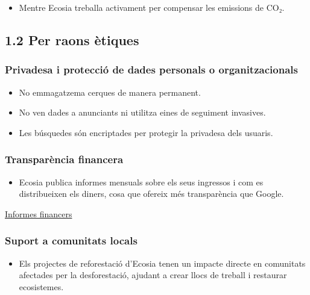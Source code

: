 \documentclass[
  a4paper,
]{article}
\providecommand{\tightlist}{%
  \setlength{\itemsep}{0pt}\setlength{\parskip}{0pt}}
\begin{document}
\begin{itemize}
\tightlist
\item
  Mentre Ecosia treballa activament per compensar les emissions de CO₂.
\end{itemize}

\subsection{1.2 Per raons ètiques}\label{per-raons-uxe8tiques}

\subsubsection{Privadesa i protecció de dades personals o
organitzacionals}\label{privadesa-i-protecciuxf3-de-dades-personals-o-organitzacionals}

\begin{itemize}
\tightlist
\item
  No emmagatzema cerques de manera permanent.
\item
  No ven dades a anunciants ni utilitza eines de seguiment invasives.
\item
  Les búsquedes són encriptades per protegir la privadesa dels usuaris.
\end{itemize}

\subsubsection{Transparència
financera}\label{transparuxe8ncia-financera}

\begin{itemize}
\tightlist
\item
  Ecosia publica informes mensuals sobre els seus ingressos i com es
  distribueixen els diners, cosa que ofereix més transparència que
  Google.
\end{itemize}

\href{https://ecosia.helpscoutdocs.com/article/402-reports-transparency}{Informes
financers}

\subsubsection{Suport a comunitats
locals}\label{suport-a-comunitats-locals}

\begin{itemize}
\tightlist
\item
  Els projectes de reforestació d'Ecosia tenen un impacte directe en
  comunitats afectades per la desforestació, ajudant a crear llocs de
  treball i restaurar ecosistemes.
\end{itemize}
\end{document}
